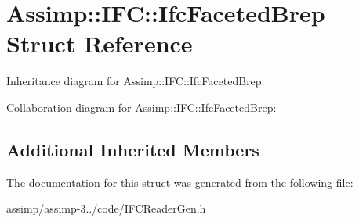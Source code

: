 \hypertarget{struct_assimp_1_1_i_f_c_1_1_ifc_faceted_brep}{\section{Assimp\+:\+:I\+F\+C\+:\+:Ifc\+Faceted\+Brep Struct Reference}
\label{struct_assimp_1_1_i_f_c_1_1_ifc_faceted_brep}
}


Inheritance diagram for Assimp\+:\+:I\+F\+C\+:\+:Ifc\+Faceted\+Brep\+:


Collaboration diagram for Assimp\+:\+:I\+F\+C\+:\+:Ifc\+Faceted\+Brep\+:
\subsection*{Additional Inherited Members}


The documentation for this struct was generated from the following file\+:\begin{DoxyCompactItemize}
\item 
assimp/assimp-\/3../code/I\+F\+C\+Reader\+Gen.\+h\end{DoxyCompactItemize}
